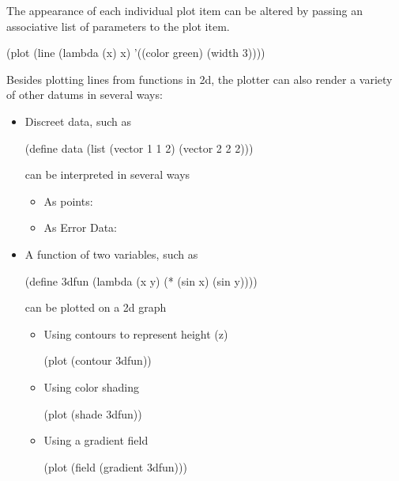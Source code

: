 \documentclass{article}
\begin{document}
{\begin{schemedisplay}
\end{schemedisplay}


The appearance of each individual plot item can be altered by passing an associative list 
      of parameters to the plot item.
\begin{schemedisplay}
(plot 
 (line 
  (lambda (x) x) 
  '((color green) (width 3))))
\end{schemedisplay}

Besides plotting lines from functions in 2d, the plotter
      can also render a variety of other datums
      in several ways:
\begin{itemize}
\item 
  Discreet data, such as
  \begin{schemedisplay}
    
(define data 
 (list 
  (vector 1 1 2) 
  (vector 2 2 2)))
\end{schemedisplay}
can be interpreted in several ways\begin{itemize}
\item As points: 
\end{itemize}
\begin{itemize}
\item As Error Data: 
\end{itemize}
\begin{itemize}
\end{itemize}


\item 
  A function of two variables, such as
\begin{schemedisplay}
(define 3dfun (lambda (x y) (* (sin x) (sin y))))
\end{schemedisplay}
can be plotted on a 2d graph
\begin{itemize}
\item Using contours to represent height (z)
 \begin{schemedisplay}
(plot (contour 3dfun))
\end{schemedisplay}

\item Using color shading
\begin{schemedisplay}
(plot (shade 3dfun))
\end{schemedisplay}

\item Using a gradient field
\begin{schemedisplay}
(plot (field (gradient 3dfun)))
\end{schemedisplay}


\end{itemize}
\end{itemize}}
\end{document}
